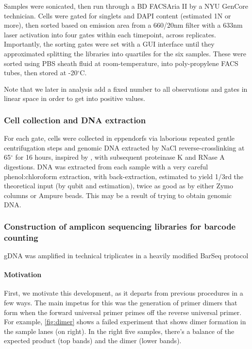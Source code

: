 Samples were sonicated, then run through a BD FACSAria II
by a NYU GenCore technician.
Cells were gated for singlets and DAPI content 
(estimated 1N or more), then sorted based on emission area from a
660/20nm filter with a 633nm laser activation
into four gates within each timepoint, across replicates.
Importantly, the sorting gates were set with a GUI interface until they
approximated splitting the libraries into quartiles for the six samples.
These were sorted using PBS sheath fluid at room-temperature, into
poly-propylene FACS tubes, then stored at -20$^{\circ}$C.

Note that we later in analysis add a fixed number to all observations
and gates in linear space in order to get into positive values.

\subsubsection{Cell collection and DNA extraction}

For each gate, cells were collected in eppendorfs via laborious 
repeated gentle centrifugation steps and genomic
DNA extracted by NaCl reverse-crosslinking at 65$^{\circ}$ for 16
hours, inspired by \cite{klemm2014transcriptional}, with
subsequent proteinase K and RNase A digestions.
DNA was extracted from each sample with a very careful
phenol:chloroform extraction, with back-extraction, estimated to yield
1/3rd the theoretical input (by qubit and estimation), twice as good
as by either Zymo columns or Ampure beads. This may be a result of
trying to obtain genomic DNA.

\subsubsection{Construction of amplicon sequencing libraries for barcode counting}

gDNA was amplified in technical triplicates in a heavily modified 
BarSeq protocol

\paragraph{Motivation}

First, we motivate this development, as it departs from previous procedures
in a few ways.  
The main impetus for this was the generation of primer dimers that form
when the forward universal primer primes off the reverse universal
primer. For example, \autoref{fig:dimer} shows a failed experiment
that shows dimer formation in the sample lanes (on right). In the right
five samples, there's a balance of the expected product (top bands) and
the dimer (lower bands).

